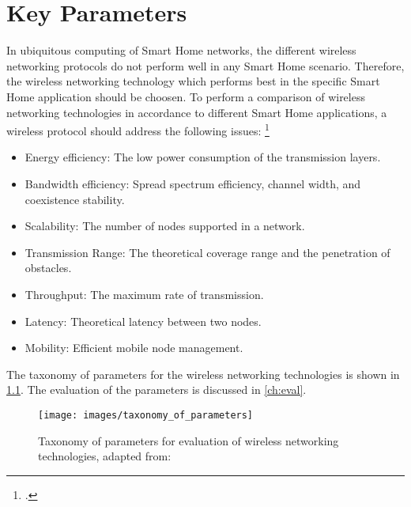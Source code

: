 \chapter{Key Parameters}
\label{ch:key-params}

In ubiquitous computing of Smart Home networks, the different wireless networking protocols do not perform well in any Smart Home scenario. Therefore, the wireless networking technology which performs best in the specific Smart Home application should be choosen. To perform a comparison of wireless networking technologies in accordance to different Smart Home applications, a wireless protocol should address the following issues: \footcite[Cf.][7289--7293]{Mendes2015}

\begin{itemize}
  \item Energy efficiency: The low power consumption of the transmission layers.
  \item Bandwidth efficiency: Spread spectrum efficiency, channel width, and coexistence stability.
  \item Scalability: The number of nodes supported in a network.
  \item Transmission Range: The theoretical coverage range and the penetration of obstacles.
  \item Throughput: The maximum rate of transmission.
  \item Latency: Theoretical latency between two nodes.
  \item Mobility: Efficient mobile node management.
\end{itemize}

The taxonomy of parameters for the wireless networking technologies is shown in \cref{fig:taxonomy_of_parameters}. The evaluation of the parameters is discussed in \cref{ch:eval}.

\begin{figure}[ht]
  \centering
  \texttt{[image: images/taxonomy\_of\_parameters]}
  \caption{Taxonomy of parameters for evaluation of wireless networking technologies, adapted from: \cite[7290]{Mendes2015}}
  \label{fig:taxonomy_of_parameters}
\end{figure}
